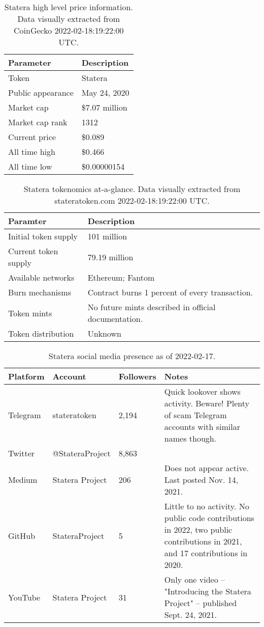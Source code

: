 \documentclass{article}
\begin{document}
\begin{longtable}[c]{ l l }
\caption{Statera high level price information. Data visually extracted from CoinGecko 2022-02-18:19:22:00 UTC.} \\
\hline
\textbf{Parameter} & \textbf{Description} \\
\hline
Token & Statera \\
Public appearance & May 24, 2020 \\
Market cap & \$7.07 million \\
Market cap rank & 1312 \\
Current price & \$0.089 \\
All time high & \$0.466 \\
All time low & \$0.00000154 \\
\hline
\end{longtable}

\begin{longtable}[c]{ l l }
\caption{Statera tokenomics at-a-glance. Data visually extracted from stateratoken.com 2022-02-18:19:22:00 UTC.} \\
\hline
\textbf{Paramter} & \textbf{Description} \\
\hline
Initial token supply & 101 million \\
Current token supply & 79.19 million \\
Available networks & Ethereum; Fantom \\
Burn mechanisms & Contract burns 1 percent of every transaction. \\
Token mints & No future mints described in official documentation. \\
Token distribution & Unknown \\
\hline
\end{longtable}

\begin{longtable}[c]{ p{} p{} p{} p{} }
\caption{Statera social media presence as of 2022-02-17.} \\
\hline
\textbf{Platform} & \textbf{Account} & \textbf{Followers} & \textbf{Notes} \\
\hline
Telegram & stateratoken & 2,194 & Quick lookover shows activity. Beware! Plenty of scam Telegram accounts with similar names though. \\
Twitter & @StateraProject & 8,863 & \\
Medium & Statera Project & 206 & Does not appear active. Last posted Nov. 14, 2021. \\
GitHub & StateraProject & 5 & Little to no activity. No public code contributions in 2022, two public contributions in 2021, and 17 contributions in 2020. \\
YouTube & Statera Project & 31 & Only one video -- "Introducing the Statera Project" -- published Sept. 24, 2021. \\
\hline
\end{longtable}

\end{document}
